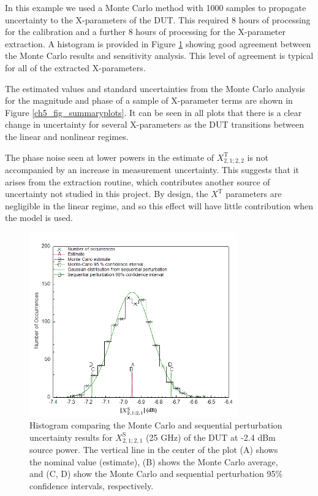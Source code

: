 \documentclass[../thesis/thesis.tex]{subfiles}
\begin{document}
In this example we used a Monte Carlo method with 1000 samples to propagate uncertainty to the X-parameters of the DUT. This required 8 hours of processing for the calibration and a further 8 hours of processing for the X-parameter extraction. A histogram is provided in Figure \ref{ch5_fig_hist} showing good agreement between the Monte Carlo results and sensitivity analysis. This level of agreement is typical for all of the extracted X-parameters.

The estimated values and standard uncertainties from the Monte Carlo analysis for the magnitude and phase of a sample of X-parameter terms are shown in Figure \ref{ch5_fig_summaryplots}. It can be seen in all plots that there is a clear change in uncertainty for several X-parameters as the DUT transitions between the linear and nonlinear regimes.

The phase noise seen at lower powers in the estimate of $X^\textrm{T}_{2,1;2,2}$ is not accompanied by an increase in measurement uncertainty. This suggests that it arises from the extraction routine, which contributes another source of uncertainty not studied in this project. By design, the $X^\textrm{T}$ parameters are negligible in the linear regime, and so this effect will have little contribution when the model is used.

\begin{figure}
	\centering
	\includegraphics[width=0.8\textwidth]{hist}
	\caption[Histogram comparing the Monte Carlo and sequential perturbation uncertainty results for the DUT.]{Histogram comparing the Monte Carlo and sequential perturbation uncertainty results for $X^\textrm{S}_{2,1;2,1}$ (25 GHz) of the DUT at -2.4 dBm source power. The vertical line in the center of the plot (A) shows the nominal value (estimate), (B) shows the Monte Carlo average, and (C, D) show the Monte Carlo and sequential perturbation 95\% confidence intervals, respectively.}
	\label{ch5_fig_hist}
\end{figure}
\end{document}
